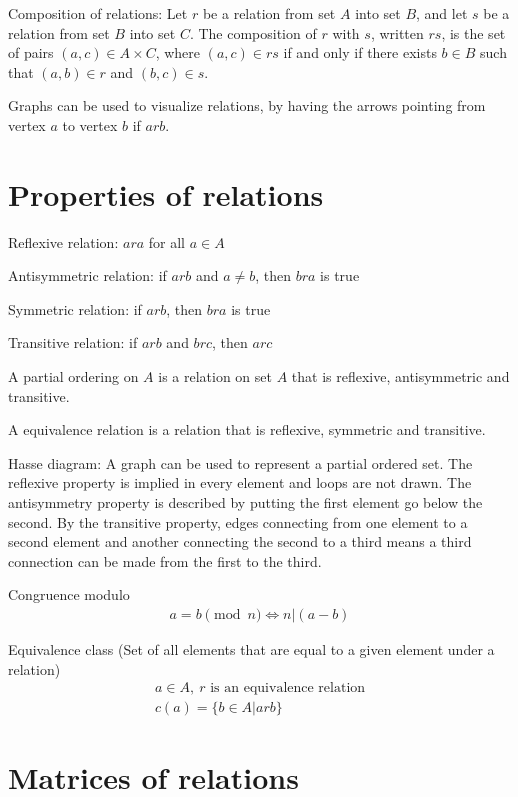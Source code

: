 \documentclass{article}
\begin{document}
Composition of relations: Let $r$ be a relation from set $A$ into set $B$, and let $s$ be a relation from set $B$ into set $C$. The composition of $r$ with $s$, written $rs$, is the set of pairs $(a,c) \in A \times C$, where $(a, c) \in rs$ if and only if there exists $b \in B$ such that $(a,b) \in r$ and $(b,c) \in s$.

Graphs can be used to visualize relations, by having the arrows pointing from vertex $a$ to vertex $b$ if $arb$.

\section{Properties of relations}

Reflexive relation: $ara$ for all $a \in A$

Antisymmetric relation: if $arb$ and $a \neq b$, then $bra$ is true

Symmetric relation: if $arb$, then $bra$ is true

Transitive relation: if $arb$ and $brc$, then $arc$

A partial ordering on $A$ is a relation on set $A$ that is reflexive, antisymmetric and transitive.

A equivalence relation is a relation that is reflexive, symmetric and transitive.

Hasse diagram: A graph can be used to represent a partial ordered set. The reflexive property is implied in every element and loops are not drawn. The antisymmetry property is described by putting the first element go below the second. By the transitive property, edges connecting from one element to a second element and another connecting the second to a third means a third connection can be made from the first to the third.

Congruence modulo
\begin{gather*}
    a = b \pmod{n} \Leftrightarrow n | (a - b)
\end{gather*}

Equivalence class (Set of all elements that are equal to a given element under a relation)
\begin{gather*}
    a \in A,\ r\text{ is an equivalence relation}\\
    c(a) = \{b \in A | arb\}
\end{gather*}

\section{Matrices of relations}
\end{document}

